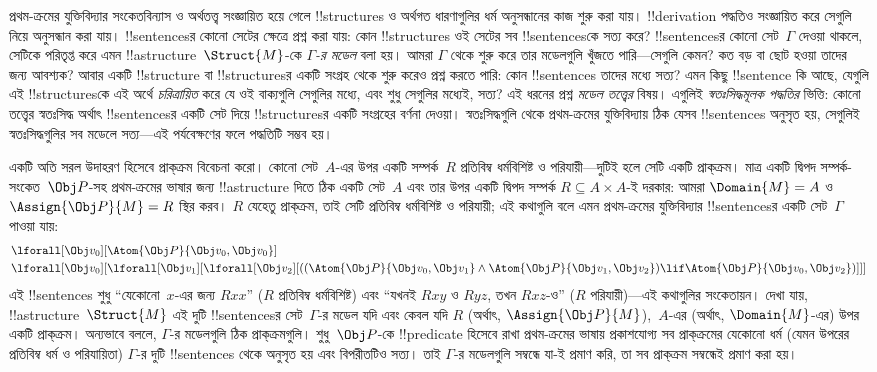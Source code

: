 \documentclass[../../../include/open-logic-section]{subfiles}
\begin{document}


প্রথম-ক্রমের যুক্তিবিদ্যার সংকেতবিন্যাস ও অর্থতত্ত্ব সংজ্ঞায়িত হয়ে গেলে
!!{structure}s ও অর্থগত ধারণাগুলির ধর্ম অনুসন্ধানের কাজ শুরু করা যায়।
!!{derivation} পদ্ধতিও সংজ্ঞায়িত করে সেগুলি নিয়ে অনুসন্ধান করা যায়।
!!{sentence}sর কোনো সেটের ক্ষেত্রে প্রশ্ন করা যায়: কোন
!!{structure}s ওই সেটের সব !!{sentence}sকে সত্য করে? !!{sentence}sর
কোনো সেট~$\Gamma$ দেওয়া থাকলে, সেটিকে পরিতৃপ্ত করে এমন
!!a{structure}~$\Struct{M}$-কে \emph{$\Gamma$-র মডেল} বলা হয়। আমরা
$\Gamma$ থেকে শুরু করে তার মডেলগুলি খুঁজতে পারি—সেগুলি কেমন? কত বড় বা
ছোট হওয়া তাদের জন্য আবশ্যক? আবার একটি !!{structure} বা
!!{structure}sর একটি সংগ্রহ থেকে শুরু করেও প্রশ্ন করতে পারি: কোন
!!{sentence}s তাদের মধ্যে সত্য? এমন কিছু !!{sentence} কি আছে, যেগুলি
এই !!{structure}sকে এই অর্থে \emph{চরিত্রায়িত} করে যে ওই বাক্যগুলি
সেগুলির মধ্যে, এবং শুধু সেগুলির মধ্যেই, সত্য? এই ধরনের প্রশ্ন
\emph{মডেল তত্ত্বের} বিষয়। এগুলিই \emph{স্বতঃসিদ্ধমূলক পদ্ধতির} ভিত্তি:
কোনো তত্ত্বের স্বতঃসিদ্ধ অর্থাৎ !!{sentence}sর একটি সেট দিয়ে
!!{structure}sর একটি সংগ্রহের বর্ণনা দেওয়া। স্বতঃসিদ্ধগুলি থেকে
প্রথম-ক্রমের যুক্তিবিদ্যায় ঠিক যেসব !!{sentence}s অনুসৃত হয়, সেগুলিই
স্বতঃসিদ্ধগুলির সব মডেলে সত্য—এই পর্যবেক্ষণের ফলে পদ্ধতিটি সম্ভব হয়।

একটি অতি সরল উদাহরণ হিসেবে প্রাক্‌ক্রম বিবেচনা করো। কোনো সেট~$A$-এর উপর
একটি সম্পর্ক~$R$ প্রতিবিম্ব ধর্মবিশিষ্ট ও পরিযায়ী—দুটিই হলে সেটি একটি
প্রাক্‌ক্রম। মাত্র একটি দ্বিপদ সম্পর্ক-সংকেত~$\Obj P$-সহ প্রথম-ক্রমের
ভাষার জন্য !!a{structure} দিতে ঠিক একটি সেট~$A$ এবং তার উপর একটি দ্বিপদ
সম্পর্ক $R \subseteq A \times A$-ই দরকার: আমরা $\Domain{M} = A$ ও
$\Assign{\Obj P}{M} = R$ স্থির করব। $R$ যেহেতু প্রাক্‌ক্রম, তাই সেটি
প্রতিবিম্ব ধর্মবিশিষ্ট ও পরিযায়ী; এই কথাগুলি বলে এমন প্রথম-ক্রমের
যুক্তিবিদ্যার !!{sentence}sর একটি সেট~$\Gamma$ পাওয়া যায়:
\begin{align*}
  & \lforall[\Obj v_0][\Atom{\Obj P}{\Obj v_0,\Obj v_0}]\\
  & \lforall[\Obj v_0][\lforall[\Obj v_1][\lforall[\Obj v_2][((\Atom{\Obj P}{\Obj v_0,\Obj v_1} \land \Atom{\Obj P}{\Obj v_1,\Obj v_2}) \lif \Atom{\Obj P}{\Obj v_0,\Obj v_2})]]]
\end{align*}
এই !!{sentence}s শুধু “যেকোনো~$x$-এর জন্য $Rxx$” ($R$ প্রতিবিম্ব
ধর্মবিশিষ্ট) এবং “যখনই $Rxy$ ও $Ryz$, তখন $Rxz$-ও” ($R$ পরিযায়ী)—এই
কথাগুলির সংকেতায়ন। দেখা যায়, !!a{structure}~$\Struct{M}$ এই দুটি
!!{sentence}sর সেট~$\Gamma$-র মডেল যদি এবং কেবল যদি $R$ (অর্থাৎ,
$\Assign{\Obj P}{M}$),~$A$-এর (অর্থাৎ, $\Domain{M}$-এর) উপর একটি
প্রাক্‌ক্রম। অন্যভাবে বললে, $\Gamma$-র মডেলগুলি ঠিক প্রাক্‌ক্রমগুলি।
শুধু~$\Obj P$-কে !!{predicate} হিসেবে রাখা প্রথম-ক্রমের ভাষায় প্রকাশযোগ্য
সব প্রাক্‌ক্রমের যেকোনো ধর্ম (যেমন উপরের প্রতিবিম্ব ধর্ম ও পরিযায়িতা)
$\Gamma$-র দুটি !!{sentence}s থেকে অনুসৃত হয় এবং বিপরীতটিও সত্য। তাই
$\Gamma$-র মডেলগুলি সম্বন্ধে যা-ই প্রমাণ করি, তা সব প্রাক্‌ক্রম সম্বন্ধেই
প্রমাণ করা হয়।
\end{document}
